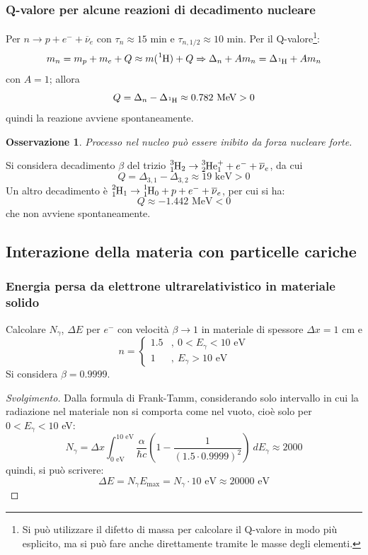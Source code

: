 \documentclass[10pt, a4paper]{scrartcl}
\numberwithin{equation}{subsection}
\theoremstyle{style1}
\newtheorem{osservazione}{Osservazione}[section]
\renewcommand\qedsymbol{$\blacksquare$}
\newenvironment{svolgimento}{\renewcommand\qedsymbol{$\spadesuit$}\begin{proof}[Svolgimento]}{\end{proof}}
\begin{document}
\subsubsection{Q-valore per alcune reazioni di decadimento nucleare}
Per $n\to p + e^- + \overline{\nu }_e$ con $\tau _n \approx 15$ min e $\tau _{n, 1/2} \approx 10$ min. Per il Q-valore\footnote{Si pu\`o utilizzare il difetto di massa per calcolare il Q-valore in modo pi\`u esplicito, ma si pu\`o fare anche direttamente tramite le masse degli elementi.}:
\[
	m_n = m_p + m_e + Q \approx m(\ce{^1H}) + Q \Rightarrow  \Delta _n + A m_n = \Delta _{\ce{^1H}} +A m_n
\] 
con $A = 1$; allora
\[
	Q = \Delta _n - \Delta _{\ce{^1H}} \approx 0.782 \text{ MeV} > 0
\] 
quindi la reazione avviene spontaneamente. 
\begin{osservazione}
	Processo nel nucleo pu\`o essere inibito da forza nucleare forte.
\end{osservazione}
\noindent Si considera decadimento $\beta $ del trizio $\ce{^3_1H_2}\to \ce{^{3}_{2}He^+_{1}}  + e^- + \overline{\nu }_e$, da cui
\[
Q = \Delta _{3,1} - \Delta _{3,2}  \approx 19 \text{ keV} > 0
\] 
Un altro decadimento \`e $\ce{^{2}_{1}H_{1}} \to \ce{^{1}_{1}H_{0}}  + p + e^- + \overline{\nu }_e$, per cui si ha:
\[
Q \approx -1.442 \text{ MeV} < 0
\] 
che non avviene spontaneamente.

\newpage
\subsection{Interazione della materia con particelle cariche}
\subsubsection{Energia persa da elettrone ultrarelativistico in materiale solido}
Calcolare $N_\gamma$, $\Delta E$ per $e^-$ con velocit\`a $\beta \to 1$ in materiale di spessore $\Delta x = 1$ cm e 
\[
n = \begin{cases}
	1.5 &,\ 0 < E_\gamma < 10 \text{ eV}\\
	1 & , \ E_\gamma> 10 \text{ eV}
\end{cases}
\] 
Si considera $\beta = 0.9999$.
\begin{svolgimento}
	Dalla formula di Frank-Tamm, considerando solo intervallo in cui la radiazione nel materiale non si comporta come nel vuoto, cio\`e solo per $0 < E_\gamma <10$ eV:
	\[
	 N_\gamma = \Delta  x	\int_{0 \text{ eV}} ^{10 \text{ eV}}  \frac{\alpha }{\hbar  c}\left(1- \frac{1}{(1.5 \cdot 0.9999)^2}\right)  \ dE_\gamma  \approx 2000
	\] 
quindi, si pu\`o scrivere:
\[
\Delta E = N_\gamma E_\text{max} = N_\gamma \cdot  10 \text{ eV} \approx 20000 \text{ eV}
\] 

\end{svolgimento}
\end{document}
